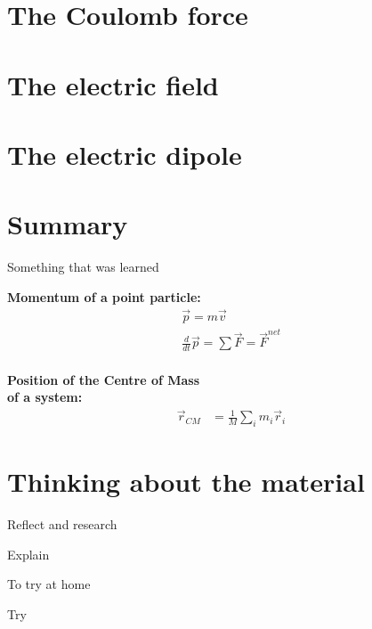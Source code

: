 \section{The Coulomb force}

\section{The electric field}

\section{The electric dipole}


\newpage
\section{Summary}

\begin{chapterSummary}
 Something that was learned
\end{chapterSummary}

\newpage
\begin{importantEquations}
\medskip
\begin{multicols}{2}
\textbf{Momentum of a point particle:}
\begin{align*}
\vec p = m\vec v \\
\frac{d}{dt}\vec p = \sum \vec F = \vec F^{net}
\end{align*}
\columnbreak
\\
\textbf{Position of the Centre of Mass \\ of a system:}
\begin{align*}
\vec r_{CM} &=\frac{1}{M}\sum_i m_i\vec r_i 
\end{align*}
\medskip
\end{multicols}
\end{importantEquations}

\newpage
\section{Thinking about the material}

\begin{chapteractivity}{Reflect and research}
{
\item Explain
}
\end{chapteractivity}

\begin{chapteractivity}{To try at home}
{
\item Try
}
\end{chapteractivity}

